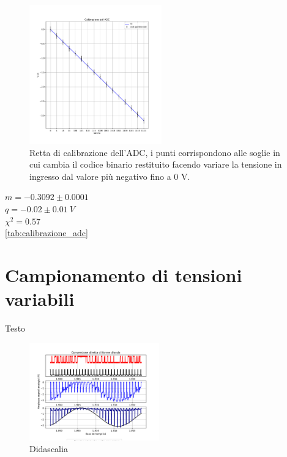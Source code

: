 \documentclass[journal]{IEEEtran}
\begin{document}
\begin{figure}[t]%
\centering
\begin{center}
\includegraphics[width=0.51\textwidth]{analysis/output/calibrazione_adc.pdf}
\end{center}
\caption{Retta di calibrazione dell'ADC, i punti corrispondono alle soglie in cui cambia il codice binario restituito facendo variare la tensione in ingresso dal valore più negativo fino a 0 V.}
\label{fig:graph_calibrazione_adc}
\end{figure}

$ m = -0.3092 \pm 0.0001 $ \\
$ q = -0.02 \pm 0.01 \ V$ \\
$ \chi^{2} = 0.57 $ \\

\ref{tab:calibrazione_adc}


\section{Campionamento di tensioni variabili}
Testo

\begin{figure}[H]%
\begin{center}
\includegraphics[trim = {0 0 0 0}, width=0.50\textwidth]{analysis/output/direct_aq_waveforms.pdf}
\caption{Didascalia}
\label{fig:circuit_DAC}
\end{center}
\end{figure}
\end{document}
